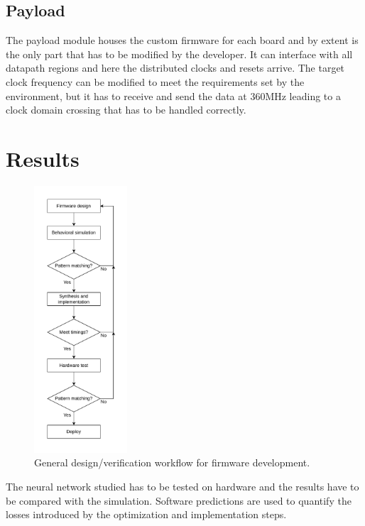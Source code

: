 \documentclass[../../main.tex]{subfiles}
\begin{document}
\subsection{Payload}
\label{sec:EMP-data}
The payload module houses the custom firmware for each board and by extent is the only part that has to be modified by the developer. It can interface with all datapath regions and here the distributed clocks and resets arrive. The target clock frequency can be modified to meet the requirements set by the environment, but it has to receive and send the data at 360MHz leading to a clock domain crossing that has to be handled correctly. 

\clearpage      
\section{Results}
\label{sec:P2GT_Res}

\begin{figure}
    \centering
    \includegraphics[width=0.31\textwidth]{sections/05/Images/FPGA_workflow.pdf}
    \caption{General design/verification workflow for firmware development.}
    \label{fig:FW_diag}
\end{figure}
The neural network studied has to be tested on hardware and the results have to be compared with the simulation. Software predictions are used to quantify the losses introduced by the optimization and implementation steps.  
\end{document}
